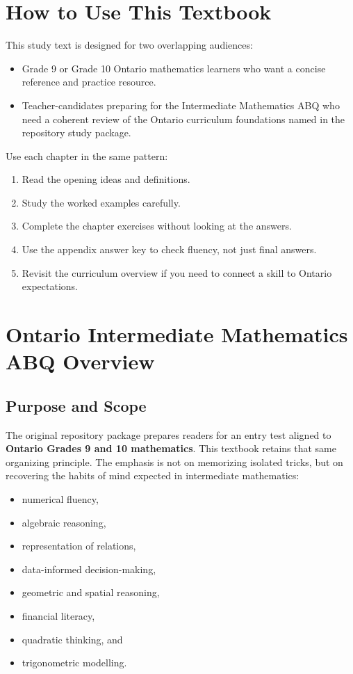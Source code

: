\documentclass[11pt,oneside]{book}
\begin{document}
\chapter*{How to Use This Textbook}
This study text is designed for two overlapping audiences:
\begin{itemize}
  \item Grade 9 or Grade 10 Ontario mathematics learners who want a concise reference and practice resource.
  \item Teacher-candidates preparing for the Intermediate Mathematics ABQ who need a coherent review of the Ontario curriculum foundations named in the repository study package.
\end{itemize}
Use each chapter in the same pattern:
\begin{enumerate}
  \item Read the opening ideas and definitions.
  \item Study the worked examples carefully.
  \item Complete the chapter exercises without looking at the answers.
  \item Use the appendix answer key to check fluency, not just final answers.
  \item Revisit the curriculum overview if you need to connect a skill to Ontario expectations.
\end{enumerate}

\tableofcontents

\mainmatter

\chapter{Ontario Intermediate Mathematics ABQ Overview}
\section{Purpose and Scope}
The original repository package prepares readers for an entry test aligned to \textbf{Ontario Grades 9 and 10 mathematics}. This textbook retains that same organizing principle. The emphasis is not on memorizing isolated tricks, but on recovering the habits of mind expected in intermediate mathematics:
\begin{itemize}
  \item numerical fluency,
  \item algebraic reasoning,
  \item representation of relations,
  \item data-informed decision-making,
  \item geometric and spatial reasoning,
  \item financial literacy,
  \item quadratic thinking, and
  \item trigonometric modelling.
\end{itemize}
\end{document}
